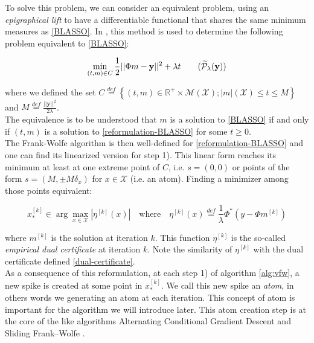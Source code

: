 \documentclass[a4paper,12pt,oneside]{report}
\theoremstyle{named}
\begin{document}
To solve this problem, we can consider an equivalent problem, using an 
\textit{epigraphical lift} \cite{Harchaoui2013} to have a differentiable functional that shares the same minimum measures as \eqref{BLASSO}. In \cite{Denoyelle_2020}, this method is used  to determine the following problem equivalent to \eqref{BLASSO}:

\begin{equation}
    \min_{(t, m) \in C}  \frac{1}{2} ||\Phi m - \mathbf{y}||^2 + \lambda t
    \tag{$\mathcal{\widetilde{P}}_\lambda (\mathbf{y})$}
    \label{reformulation-BLASSO}
\end{equation}

where we defined the set $C \stackrel{def}{=} \left\{(t,m) \in \mathbb{R}^+ \times \mathcal{M}(\mathcal{X});  |m|(\mathcal{X}) \leq t \leq M \right\}$ and $M \stackrel{def}{=} \frac{||\mathbf{y}||^2}{2 \lambda}$. \\

The equivalence is to be understood that $m$ is a solution to \eqref{BLASSO} if and only if $(t, m)$ is a solution to \eqref{reformulation-BLASSO} for some $t \geq 0$. \\

The Frank-Wolfe algorithm is then well-defined for \eqref{reformulation-BLASSO} and one can find its linearized version for step 1).  This linear form reaches its minimum at least at one extreme point of $C$, i.e. $s = (0, 0)$ or points of the form $s = (M, ±M\delta_x)$ for $x \in \mathcal{X}$ (i.e. an atom). Finding a minimizer among those points equivalent:

\begin{equation}
    x^{[k]}_* \in \arg \max_{x \in \mathcal{X}} |\eta^{[k]}(x)| \quad \text{where} \quad \eta^{[k]}(x) \stackrel{def}{=} \frac{1}{\lambda} \Phi^{*} (y - \Phi m^{[k]})
    \label{emperical-dual-certificate}
\end{equation}

where $m^{[k]}$ is the solution at iteration $k$. This function $\eta^{[k]}$ is the so-called \textit{empirical dual certificate} at iteration $k$. Note the similarity of $\eta^{[k]}$ with the dual certificate defined \eqref{dual-certificate}.\\

As a consequence of this reformulation, at each step 1) of algorithm \ref{alg:vfw}, a new spike is created at some point in $x^{[k]}_*$. We call this new spike an \textit{atom}, in others words we generating an atom at each iteration. This concept of atom is important for the algorithm we will introduce later. This atom creation step is at the core of the like algorithms Alternating Conditional Gradient Descent \cite{Boyd2015} and  Sliding Frank–Wolfe \cite{Denoyelle_2020}.
\end{document}

